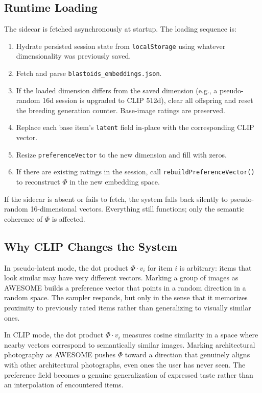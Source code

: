 \documentclass[12pt, a4paper]{article}
\begin{document}
\subsection{Runtime Loading}

The sidecar is fetched asynchronously at startup. The loading sequence is:

\begin{enumerate}[leftmargin=2em]
\item Hydrate persisted session state from \texttt{localStorage} using whatever dimensionality was previously saved.
\item Fetch and parse \texttt{blastoids\_embeddings.json}.
\item If the loaded dimension differs from the saved dimension (e.g., a pseudo-random 16d session is upgraded to CLIP 512d), clear all offspring and reset the breeding generation counter. Base-image ratings are preserved.
\item Replace each base item's \texttt{latent} field in-place with the corresponding CLIP vector.
\item Resize \texttt{preferenceVector} to the new dimension and fill with zeros.
\item If there are existing ratings in the session, call \texttt{rebuildPreferenceVector()} to reconstruct $\Phi$ in the new embedding space.
\end{enumerate}

If the sidecar is absent or fails to fetch, the system falls back silently to pseudo-random 16-dimensional vectors. Everything still functions; only the semantic coherence of $\Phi$ is affected.

\subsection{Why CLIP Changes the System}

In pseudo-latent mode, the dot product $\Phi \cdot v_i$ for item $i$ is arbitrary: items that look similar may have very different vectors. Marking a group of images as AWESOME builds a preference vector that points in a random direction in a random space. The sampler responds, but only in the sense that it memorizes proximity to previously rated items rather than generalizing to visually similar ones.

In CLIP mode, the dot product $\Phi \cdot v_i$ measures cosine similarity in a space where nearby vectors correspond to semantically similar images. Marking architectural photography as AWESOME pushes $\Phi$ toward a direction that genuinely aligns with other architectural photographs, even ones the user has never seen. The preference field becomes a genuine generalization of expressed taste rather than an interpolation of encountered items.
\end{document}
